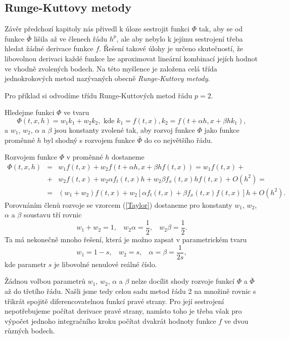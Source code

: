 \documentclass[a4paper, 12pt]{book}
\theoremstyle{definition}
\begin{document}
\subsection{Runge-Kuttovy metody}
Závěr předchozí kapitoly nás přivedl k úloze sestrojit funkci $\Phi$ tak, aby se od
funkce $\bar\Phi$ lišila až ve členech řádu $h^p$, ale aby nebylo k jejímu sestrojení 
třeba hledat žádné derivace funkce $f$. Řešení takové úlohy je určeno skutečností,
že libovolnou derivaci každé funkce lze aproximovat lineární kombinací jejích hodnot 
ve vhodně zvolených bodech. Na této myšlence je založena celá třída jednokrokových 
metod nazývaných obecně {\em Runge-Kuttovy metody}.

Pro příklad si odvodíme třídu Runge-Kuttových metod řádu $p=2$.

Hledejme funkci $\Phi$ ve tvaru 
\begin{displaymath}
\Phi(t,x,h)=w_1k_1+w_2k_2,\mbox{ kde~} k_1=f(t,x), k_2=f(t+\alpha h,x+\beta h k_1),
\end{displaymath}
a $w_1$, $w_2$, $\alpha$ a $\beta$ jsou konstanty zvolené tak, aby rozvoj funkce 
$\Phi$ jako funkce proměnné $h$ byl shodný s rozvojem funkce $\bar\Phi$ do co 
největšího řádu.

Rozvojem funkce $\Phi$ v proměnné $h$ dostaneme
\begin{eqnarray*}
\Phi(t,x,h)\!&\!=\!&\! w_1 f(t,x)+ w_2 f(t+\alpha h,x+\beta h f(t,x))=w_1 f(t,x)+ \\
&\!+\!&\! w_2 f(t,x)+ w_2\alpha f_t(t,x) h+w_2\beta f_x(t,x)hf(t,x)+ O(h^2)=\\
&\!=\!&\! (w_1+w_2) f(t,x)+ w_2[\alpha f_t(t,x)+ \beta f_x(t,x)f(t,x)]h+O(h^2).
\end{eqnarray*}
Porovnáním členů rozvoje se vzorcem (\ref{Taylor}) dostaneme pro konstanty
$w_1$, $w_2$, $\alpha$ a $\beta$ soustavu tří rovnic
\begin{displaymath}
w_1+w_2=1,~~~~w_2 \alpha=\frac 12,~~~~w_2\beta=\frac 12.
\end{displaymath}
Ta má nekonečně mnoho řešení, která je možno zapsat v parametrickém tvaru
\begin{equation}\label{RKmet2r}
w_1=1-s,~~~~w_2=s,~~~~\alpha=\beta=\frac 1{2s},
\end{equation}
kde parametr $s$ je libovolné nenulové reálné číslo.

Žádnou volbou parametrů $w_1$, $w_2$, $\alpha$ a $\beta$ nelze docílit shody
rozvoje funkcí $\Phi$ a $\bar\Phi$ až do třetího řádu. Našli jsme tedy celou 
sadu metod řádu 2 na množině rovnic s třikrát spojitě diferencovatelnou funkcí 
pravé strany. Pro její sestrojení nepotřebujeme počítat derivace pravé strany,
namísto toho je třeba však pro výpočet jednoho integračního kroku počítat 
dvakrát hodnoty funkce $f$ ve dvou různých bodech.
\end{document}
